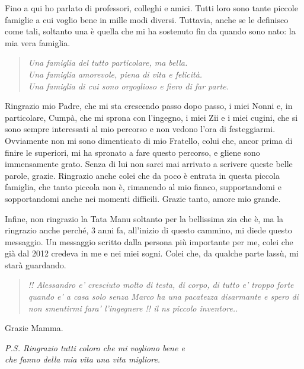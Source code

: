 Fino a qui ho parlato di professori, colleghi e amici. Tutti loro sono tante piccole famiglie a cui voglio bene in mille modi diversi.
Tuttavia, anche se le definisco come tali, soltanto una è quella che mi ha sostenuto fin da quando sono nato: la mia vera famiglia.
\begin{quote}
\textit{Una famiglia del tutto particolare, ma bella.\\
Una famiglia amorevole, piena di vita e felicità.\\
Una famiglia di cui sono orgoglioso e fiero di far parte.}
\end{quote}
Ringrazio mio Padre, che mi sta crescendo passo dopo passo, i miei Nonni e, in particolare, Cumpà, che mi sprona con l'ingegno, i miei Zii e i miei cugini, che si sono sempre interessati al mio percorso e non vedono l'ora di festeggiarmi.
Ovviamente non mi sono dimenticato di mio Fratello, colui che, ancor prima di finire le superiori, mi ha spronato a fare questo percorso, e gliene sono immensamente grato. Senza di lui non sarei mai arrivato a scrivere queste belle parole, grazie.
Ringrazio anche colei che da poco è entrata in questa piccola famiglia, che tanto piccola non è, rimanendo al mio fianco, supportandomi e sopportandomi anche nei momenti difficili. Grazie tanto, amore mio grande.

Infine, non ringrazio la Tata Manu soltanto per la bellissima zia che è, ma la ringrazio anche perché, 3 anni fa, all'inizio di questo cammino, mi diede questo messaggio.
Un messaggio scritto dalla persona più importante per me, colei che già dal 2012 credeva in me e nei miei sogni. Colei che, da qualche parte lassù, mi starà guardando.
\begin{quote}
    \textit{!! Alessandro e' cresciuto molto di testa, di corpo, di tutto e' troppo forte quando e' a casa solo senza Marco ha una pacatezza disarmante e spero di non smentirmi fara' l'ingegnere !! il ns piccolo inventore..}
\end{quote}
Grazie Mamma.

\vspace{2cm}

\noindent
\textit{P.S. Ringrazio tutti coloro che mi vogliono bene e\\ che fanno della mia vita una vita migliore.}